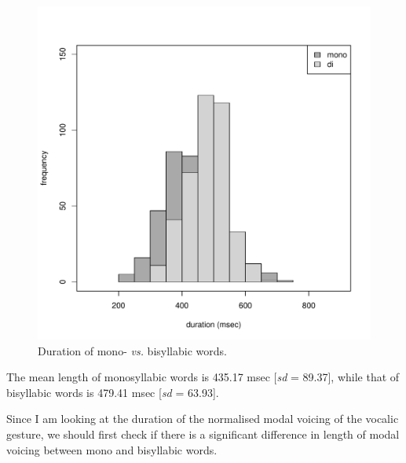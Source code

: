 \documentclass[a4paper,11pt]{article}\usepackage[]{graphicx}\usepackage[]{color}
\makeatletter
\def\maxwidth{ %
  \ifdim\Gin@nat@width>\linewidth
    \linewidth
  \else
    \Gin@nat@width
  \fi
}
\newenvironment{knitrout}{}{} %
\makeatother
\begin{document}
\begin{figure}
\begin{knitrout}
\color{fgcolor}
\includegraphics[width=\maxwidth]{img/word-duration-1} 

\end{knitrout}
\caption{Duration of mono- \textit{vs.} bisyllabic words.}
\end{figure}

The mean length of monosyllabic words is 435.17 msec [\textit{sd} = 89.37], while that of bisyllabic words is 479.41 msec [\textit{sd} = 63.93].

Since I am looking at the duration of the normalised modal voicing of the vocalic gesture, we should first check if there is a significant difference in length of modal voicing between mono and bisyllabic words.
\end{document}
